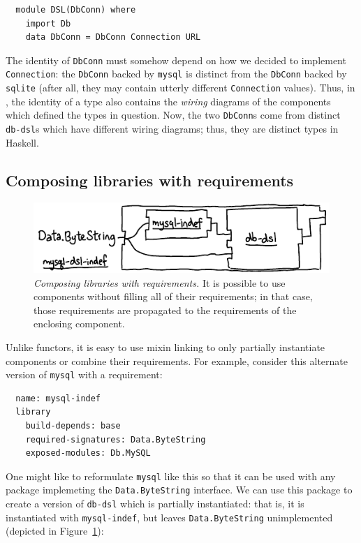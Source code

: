 \begin{verbatim}
  module DSL(DbConn) where
    import Db
    data DbConn = DbConn Connection URL
\end{verbatim}
%
The identity of \verb|DbConn| must somehow depend on how
we decided to implement \verb|Connection|: the \verb|DbConn| backed by
\verb|mysql| is distinct from the \verb|DbConn| backed by \verb|sqlite|
(after all, they may contain utterly different \verb|Connection| values).
Thus, in \Backpack{}, the identity of a type
also contains the \emph{wiring} diagrams of the components which
defined the types in question.  Now, the two \verb|DbConn|s come from
distinct \verb|db-dsl|s which have different wiring diagrams;
thus, they are distinct types in Haskell.

\subsection{Composing libraries with requirements}

\begin{figure}
\includegraphics{diagrams/composing-requirements.pdf}
\caption{\emph{Composing libraries with requirements.} It is possible
to use components without filling all of their requirements; in that
case, those requirements are propagated to the requirements of the
enclosing component.}
\label{fig:composing-requirements}
\end{figure}

Unlike functors, it is easy to use mixin linking to only partially
instantiate components or combine their requirements.  For example,
consider this alternate version of \verb|mysql| with a requirement:

\begin{verbatim}
  name: mysql-indef
  library
    build-depends: base
    required-signatures: Data.ByteString
    exposed-modules: Db.MySQL
\end{verbatim}
%
One might like to reformulate \verb|mysql| like this so that it can
be used with any package implemeting the \verb|Data.ByteString| interface.
We can use this package to create a version of \verb|db-dsl|
which is partially instantiated: that is, it is instantiated
with \verb|mysql-indef|, but leaves \verb|Data.ByteString|
unimplemented (depicted in Figure~\ref{fig:composing-requirements}):

